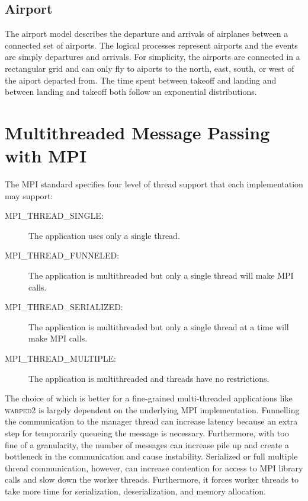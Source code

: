 \documentclass[11pt]{book}
\begin{document}
\subsection{Airport}

The airport model describes the departure and arrivals of airplanes between a connected
set of airports. The logical processes represent airports and the events are simply
departures and arrivals. For simplicity, the airports are connected in a rectangular grid
and can only fly to aiports to the north, east, south, or west of the aiport departed from.
The time spent between takeoff and landing and between landing and takeoff both follow an
exponential distributions.

\section{Multithreaded Message Passing with MPI}

The MPI standard specifies four level of thread support that each implementation may support:

\begin{description}
    \item[MPI\_THREAD\_SINGLE:] The application uses only a single thread.
    \item[MPI\_THREAD\_FUNNELED:] The application is multithreaded but only a single thread will
        make MPI calls.
    \item[MPI\_THREAD\_SERIALIZED:] The application is multithreaded but only a single thread at
        a time will make MPI calls.
    \item[MPI\_THREAD\_MULTIPLE:] The application is multithreaded and threads have no restrictions.
\end{description}

The choice of which is better for a fine-grained multi-threaded applications like \textsc{warped2}
is largely dependent on the underlying MPI implementation. Funnelling the communication to the
manager thread can increase latency because an extra step for temporarily queueing the message
is necessary. Furthermore, with too fine of a granularity, the number of messages can increase
pile up and create a bottleneck in the communication and cause instability. Serialized or full
multiple thread communication, however, can increase contention for access to MPI library calls
and slow down the worker threads. Furthermore, it forces worker threads to take more time for
serialization, deserialization, and memory allocation.
\end{document}
